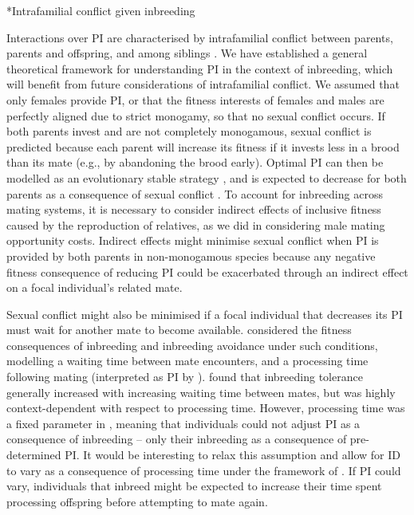 \documentclass[12pt]{article}
\makeatletter
\renewcommand\subsection{\@startsection{subsection}{1}{-0.25in}{-0.5\baselineskip}{0.1\baselineskip}{\normalfont\normalsize\bfseries\textit}}
\makeatother
\begin{document}
\subsection*{Intrafamilial conflict given inbreeding}

Interactions over PI are characterised by intrafamilial conflict between parents, parents and offspring, and among siblings \cite[][]{Parker2002}. We have established a general theoretical framework for understanding PI in the context of inbreeding, which will benefit from future considerations of intrafamilial conflict. We assumed that only females provide PI, or that the fitness interests of females and males are perfectly aligned due to strict monogamy, so that no sexual conflict occurs. If both parents invest and are not completely monogamous, sexual conflict is predicted because each parent will increase its fitness if it invests less in a brood than its mate (e.g., by abandoning the brood early). Optimal PI can then be modelled as an evolutionary stable strategy \cite[][]{Smith1977}, and is expected to decrease for both parents as a consequence of sexual conflict \cite[][]{Parker1985}. To account for inbreeding across mating systems, it is necessary to consider indirect effects of inclusive fitness caused by the reproduction of relatives, as we did in considering male mating opportunity costs. Indirect effects might minimise sexual conflict when PI is provided by both parents in non-monogamous species because any negative fitness consequence of reducing PI could be exacerbated through an indirect effect on a focal individual's related mate. 

Sexual conflict might also be minimised if a focal individual that decreases its PI must wait for another mate to become available. \cite{Kokko2006} considered the fitness consequences of inbreeding and inbreeding avoidance under such conditions, modelling a waiting time between mate encounters, and a processing time following mating (interpreted as PI by \cite{Kokko2006}). \cite{Kokko2006} found that inbreeding tolerance generally increased with increasing waiting time between mates, but was highly context-dependent with respect to processing time. However, processing time was a fixed parameter in \cite{Kokko2006}, meaning that individuals could not adjust PI as a consequence of inbreeding -- only their inbreeding as a consequence of pre-determined PI. It would be interesting to relax this assumption and allow for ID to vary as a consequence of processing time under the framework of \cite{Kokko2006}. If PI could vary, individuals that inbreed might be expected to increase their time spent processing offspring before attempting to mate again.
\end{document}
